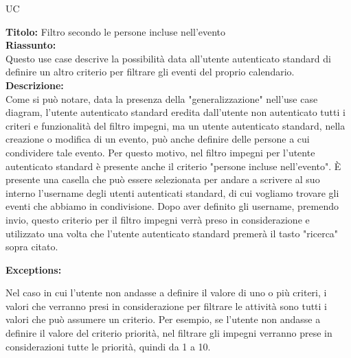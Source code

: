 \begin{listaPersonale}{UC}
\begin{listaPersonale2}[UC] {}
                \textbf{Titolo: } Filtro secondo le persone incluse nell'evento \\
                \textbf{Riassunto: } \\ Questo use case descrive la possibilità data all'utente autenticato standard di definire un altro criterio per filtrare gli eventi del proprio calendario.\\
                \textbf{Descrizione: } \\ Come si può notare, data la presenza della "generalizzazione" nell'use case diagram, l'utente autenticato standard eredita dall'utente non autenticato tutti i criteri e funzionalità del filtro impegni, ma un utente autenticato standard, nella creazione o modifica di un evento, può anche definire delle persone a cui condividere tale evento. Per questo motivo, nel filtro impegni per l'utente autenticato standard è presente anche il criterio "persone incluse nell'evento". È presente una casella che può essere selezionata per andare a scrivere al suo interno l'username degli utenti autenticati standard, di cui vogliamo trovare gli eventi che abbiamo in condivisione.
                Dopo aver definito gli username, premendo invio, questo criterio per il filtro impegni verrà preso in considerazione e utilizzato una volta che l'utente autenticato standard premerà il tasto "ricerca" sopra citato.

                \textbf{Exceptions:}
                \begin{enumerate}[label=\textbf{[exception \arabic{enumiii}]}, ref= \textbf{[exception \arabic{enumiii}]}]
                     Nel caso in cui l'utente non andasse a definire il valore di uno o più criteri, i valori che verranno presi in considerazione per filtrare le attività sono tutti i valori che può assumere un criterio. Per esempio, se l'utente non andasse a definire il valore del criterio priorità, nel filtrare gli impegni verranno prese in considerazioni tutte le priorità, quindi da 1 a 10.
                \end{enumerate}
    \end{listaPersonale2}





    \begin{center}
        
    \end{center}



\end{listaPersonale}
